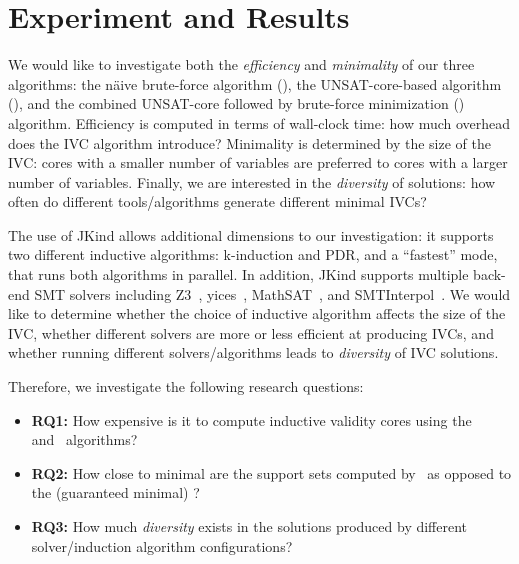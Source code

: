 \section{Experiment and Results}
\label{sec:experiment}


We would like to investigate both the {\em efficiency} and {\em minimality} of our three algorithms: the n{\"a}ive brute-force algorithm (\bfalg), the UNSAT-core-based algorithm (\ucalg), and the combined UNSAT-core followed by brute-force minimization (\ucbfalg) algorithm.  Efficiency is computed in terms of wall-clock time: how much overhead does the IVC algorithm introduce?  Minimality is determined by the size of the IVC: cores with a smaller number of variables are preferred to cores with a larger number of variables.  Finally, we are interested in the {\em diversity} of solutions: how often do different tools/algorithms generate different minimal IVCs?

The use of JKind allows additional dimensions to our investigation: it supports two different inductive algorithms: k-induction and PDR, and a ``fastest'' mode, that runs both algorithms in parallel.  In addition, JKind supports multiple back-end SMT solvers including Z3~\cite{DeMoura08:z3}, yices~\cite{Dutertre06:yices}, MathSAT~\cite{Cimatti2013:MathSAT}, and SMTInterpol~\cite{Christ2012:SMTInterpol}.  We would like to determine whether the choice of inductive algorithm affects the size of the IVC, whether different solvers are more or less efficient at producing IVCs, and whether running different solvers/algorithms leads to {\em diversity} of IVC solutions.

Therefore, we investigate the following research questions:
\begin{itemize}
    \item \textbf{RQ1:} How expensive is it to compute inductive validity cores using the \bfalg\, \ucalg\, and \ucbfalg\ algorithms?
    \item \textbf{RQ2:} How close to minimal are the support sets computed by \ucalg\ as opposed to the (guaranteed minimal) \ucbfalg?
    \item \textbf{RQ3:} How much {\em diversity} exists in the solutions produced by different solver/induction algorithm configurations?
\end{itemize}

